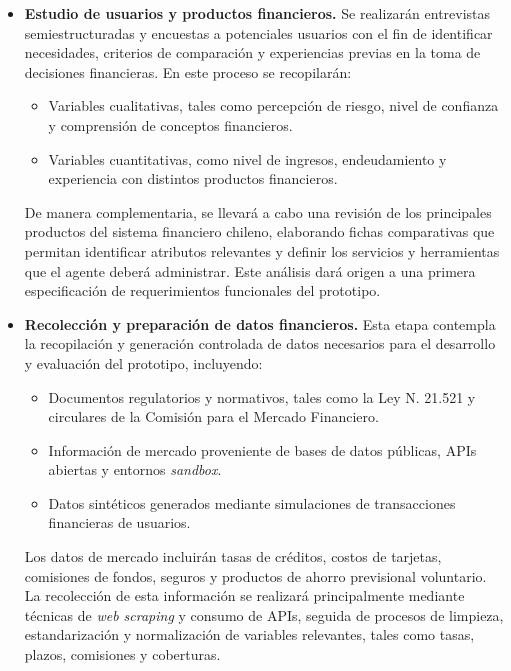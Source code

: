\documentclass[
	spanish, %
	letterpaper, oneside
]{book}
\begin{document}
\begin{itemize}
    \item \textbf{Estudio de usuarios y productos financieros.}  
    Se realizarán entrevistas semiestructuradas y encuestas a potenciales usuarios con el fin de identificar necesidades, criterios de comparación y experiencias previas en la toma de decisiones financieras. En este proceso se recopilarán:
    \begin{itemize}
        \item Variables cualitativas, tales como percepción de riesgo, nivel de confianza y comprensión de conceptos financieros.
        \item Variables cuantitativas, como nivel de ingresos, endeudamiento y experiencia con distintos productos financieros.
    \end{itemize}
    De manera complementaria, se llevará a cabo una revisión de los principales productos del sistema financiero chileno, elaborando fichas comparativas que permitan identificar atributos relevantes y definir los servicios y herramientas que el agente deberá administrar. Este análisis dará origen a una primera especificación de requerimientos funcionales del prototipo.
    
  \item \textbf{Recolección y preparación de datos financieros.}  
Esta etapa contempla la recopilación y generación controlada de datos necesarios para el desarrollo y evaluación del prototipo, incluyendo:
\begin{itemize}
    \item Documentos regulatorios y normativos, tales como la Ley N.\textordmasculine{} 21.521 y circulares de la Comisión para el Mercado Financiero.
    \item Información de mercado proveniente de bases de datos públicas, APIs abiertas y entornos \emph{sandbox}.
    \item Datos sintéticos generados mediante simulaciones de transacciones financieras de usuarios.
\end{itemize}

Los datos de mercado incluirán tasas de créditos, costos de tarjetas, comisiones de fondos, seguros y productos de ahorro previsional voluntario. La recolección de esta información se realizará principalmente mediante técnicas de \emph{web scraping} y consumo de APIs, seguida de procesos de limpieza, estandarización y normalización de variables relevantes, tales como tasas, plazos, comisiones y coberturas.


\end{itemize}
\end{document}
